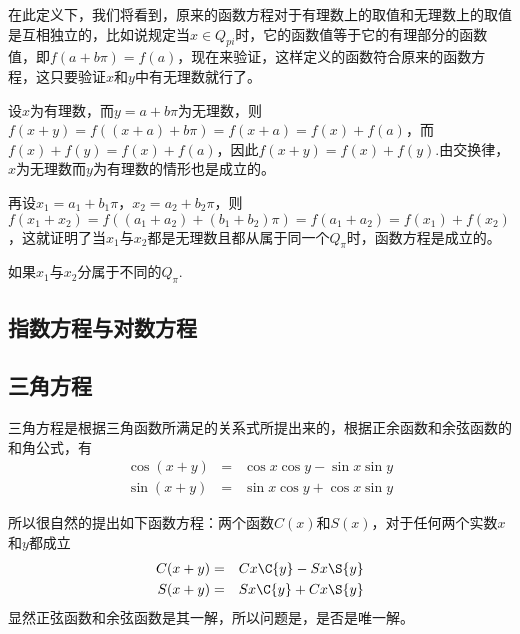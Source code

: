 在此定义下，我们将看到，原来的函数方程对于有理数上的取值和无理数上的取值是互相独立的，比如说规定当$x \in Q_{pi}$时，它的函数值等于它的有理部分的函数值，即$f(a+b\pi)=f(a)$，现在来验证，这样定义的函数符合原来的函数方程，这只要验证$x$和$y$中有无理数就行了。

设$x$为有理数，而$y=a+b\pi$为无理数，则$f(x+y)=f((x+a)+b\pi)=f(x+a)=f(x)+f(a)$，而$f(x)+f(y)=f(x)+f(a)$，因此$f(x+y)=f(x)+f(y)$.由交换律，$x$为无理数而$y$为有理数的情形也是成立的。

再设$x_1=a_1+b_1\pi$，$x_2=a_2+b_2\pi$，则$f(x_1+x_2)=f((a_1+a_2)+(b_1+b_2)\pi)=f(a_1+a_2)=f(x_1)+f(x_2)$，这就证明了当$x_1$与$x_2$都是无理数且都从属于同一个$Q_{\pi}$时，函数方程是成立的。

如果$x_1$与$x_2$分属于不同的$Q_{\pi}$.

\subsection{指数方程与对数方程}
\label{sec:exponent-equation-and-logarithm-equation}

\subsection{三角方程}
\label{sec:triangle-function-equation}

三角方程是根据三角函数所满足的关系式所提出来的，根据正余函数和余弦函数的和角公式，有
\begin{eqnarray*}
  \cos{(x+y)} & = & \cos{x}\cos{y} - \sin{x}\sin{y} \\
  \sin{(x+y)} & = & \sin{x}\cos{y} + \cos{x}\sin{y}
\end{eqnarray*}

所以很自然的提出如下函数方程：两个函数$C(x)$和$S(x)$，对于任何两个实数$x$和$y$都成立
\begin{eqnarray*}
  C{(x+y)} & = & C{x}\C{y} - S{x}\S{y} \\
  S{(x+y)} & = & S{x}\C{y} + C{x}\S{y}
\end{eqnarray*}
显然正弦函数和余弦函数是其一解，所以问题是，是否是唯一解。




